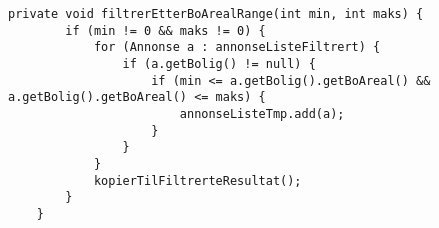 \begin{lstlisting}[caption=AnnonseFilter.java: Eksepel på privat filtreringsklasse etter bolig areal som foretas mellom trinn for pris og balkong., label=kode:filtrering3]
    private void filtrerEtterBoArealRange(int min, int maks) {
        if (min != 0 && maks != 0) {
            for (Annonse a : annonseListeFiltrert) {
                if (a.getBolig() != null) {
                    if (min <= a.getBolig().getBoAreal() && a.getBolig().getBoAreal() <= maks) {
                        annonseListeTmp.add(a);
                    }
                }
            }
            kopierTilFiltrerteResultat();
        }
    }
\end{lstlisting}